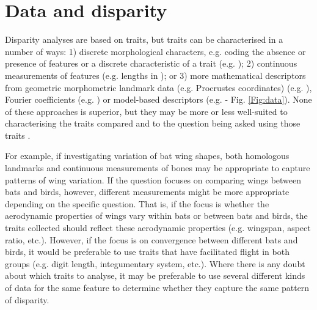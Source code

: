 \documentclass[12pt,letterpaper]{article}
\begin{document}



\section{Data and disparity} \label{section:data}


\noindent Disparity analyses are based on traits, but traits can be characterised in a number of ways:
1) discrete morphological characters, e.g. coding the absence or presence of features or a discrete characteristic of a trait (e.g. \citealt{Foote1989, Deline2018});
2) continuous measurements of features (e.g. lengths in \citealt{Friedman2010});
or 3) more mathematical descriptors from geometric morphometric landmark data (e.g.
Procrustes coordinates)  (e.g. \citealt{sherratt2017rates}), Fourier coefficients (e.g. \citealt{Foote1995, Spriggs2018}) or model-based descriptors (e.g. \citealt{Raup1961,Saunders2004} - Fig. \ref{Fig:data}).
None of these approaches is superior, but they may be more or less well-suited to characterising the traits compared and to the question being asked using those traits \citep{hetherington2015cladistic,Hopkins2017}.

For example, if investigating variation of bat wing shapes, both homologous landmarks and continuous measurements of bones may be appropriate to capture patterns of wing variation.
If the question focuses on comparing wings between bats and birds, however, different measurements might be more appropriate depending on the specific question.
That is, if the focus is whether the aerodynamic properties of wings vary within bats or between bats and birds, the traits collected should reflect these aerodynamic properties (e.g. wingspan, aspect ratio, etc.).
However, if the focus is on convergence between different bats and birds, it would be preferable to use traits that have facilitated flight in both groups (e.g.
digit length, integumentary system, etc.).
Where there is any doubt about which traits to analyse, it may be preferable to use several different kinds of data for the same feature to determine whether they capture the same pattern of disparity.
\end{document}
